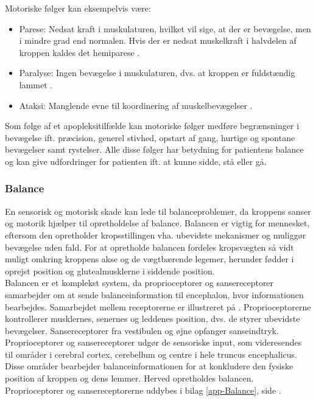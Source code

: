 \noindent Motoriske følger kan eksempelvis være:
\begin{itemize}
  \item Parese: Nedsat kraft i muskulaturen, hvilket vil sige, at der er bevægelse, men i mindre grad end normalen. Hvis der er nedsat muskelkraft i halvdelen af kroppen kaldes det hemiparese \cite{Kruuse2015a}.
  \item Paralyse: Ingen bevægelse i muskulaturen, dvs. at kroppen er fuldstændig lammet \cite{Vistrup2015}.
  \item Ataksi: Manglende evne til koordinering af muskelbevægelser \cite{Redaktionen2015a}.
\end{itemize}
Som følge af et apopleksitilfælde kan motoriske følger medføre begrænsninger i bevægelse ift. præcision, generel stivhed, opstart af gang, hurtige og spontane bevægelser samt rystelser. Alle disse følger har betydning for patientens balance og kan give udfordringer for patienten ift. at kunne sidde, stå eller gå. \cite{Kruuse2015a,DSfA2009}

\subsubsection{Balance}\label{BalanceAfsnit}
En sensorisk og motorisk skade kan lede til balanceproblemer, da kroppens sanser og motorik hjælper til opretholdelse af balance. Balancen er vigtig for mennesket, eftersom den opretholder kropsstillingen vha. ubevidste mekanismer og muliggør bevægelse uden fald. For at opretholde balancen fordeles kropsvægten så vidt muligt omkring kroppens akse og de vægtbærende legemer, herunder fødder i oprejst position og glutealmusklerne i siddende position. \cite{Nichols1997} \\
Balancen er et komplekst system, da proprioceptorer og sansereceptorer samarbejder om at sende balanceinformation til encephalon, hvor informationen bearbejdes. Samarbejdet mellem receptorerne er illustreret på . Proprioceptorerne kontrollerer musklernes, senernes og leddenes position, dvs. de styrer ubevidste bevægelser. \cite{Martini2012} Sansereceptorer fra vestibulen og øjne opfanger sanseindtryk. Proprioceptorer og sansereceptorer udgør de sensoriske input, som videresendes til områder i cerebral cortex, cerebellum og centre i hele truncus encephalicus. Disse områder bearbejder balanceinformationen for at konkludere den fysiske position af kroppen og dens lemmer. Herved opretholdes balancen. \cite{Karnath2003,Martini2012} Proprioceptorer og sansereceptorerne uddybes i bilag \ref{app-Balance}, side \pageref{app-Balance}.

